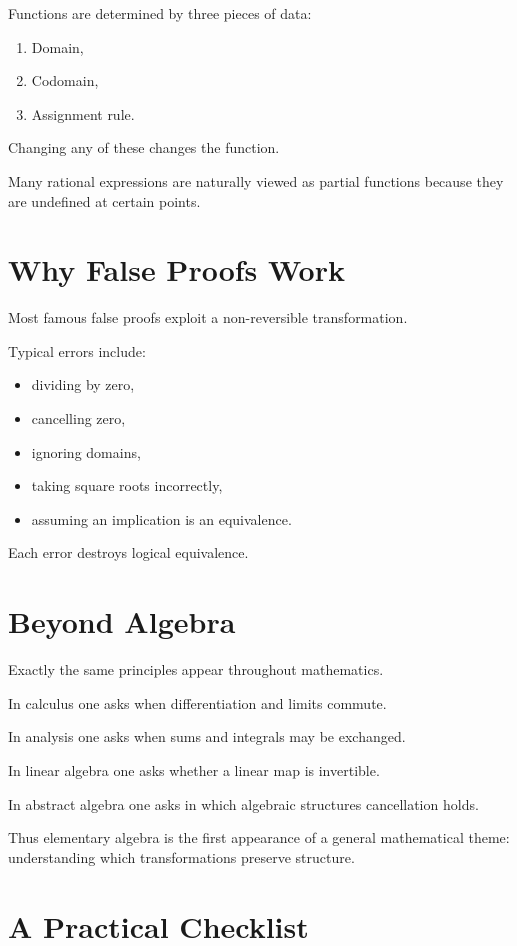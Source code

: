 \documentclass{essay}
\begin{document}
Functions are determined by three pieces of data:

\begin{enumerate}
\item Domain,
\item Codomain,
\item Assignment rule.
\end{enumerate}

Changing any of these changes the function.

Many rational expressions are naturally viewed as partial functions because
they are undefined at certain points.

\section{Why False Proofs Work}

Most famous false proofs exploit a non-reversible transformation.

Typical errors include:

\begin{itemize}
\item dividing by zero,
\item cancelling zero,
\item ignoring domains,
\item taking square roots incorrectly,
\item assuming an implication is an equivalence.
\end{itemize}

Each error destroys logical equivalence.

\section{Beyond Algebra}

Exactly the same principles appear throughout mathematics.

In calculus one asks when differentiation and limits commute.

In analysis one asks when sums and integrals may be exchanged.

In linear algebra one asks whether a linear map is invertible.

In abstract algebra one asks in which algebraic structures cancellation holds.

Thus elementary algebra is the first appearance of a general mathematical
theme: understanding which transformations preserve structure.

\section{A Practical Checklist}
\end{document}
